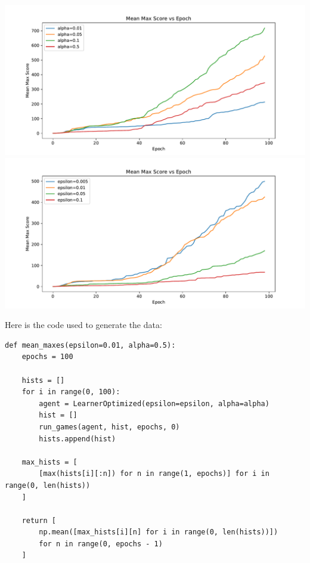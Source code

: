 \documentclass[expanded]{lkx_pset}
\begin{document}
\begin{parts}
	\begin{center}
		\includegraphics[scale=0.5]{figures/alpha_graph.pdf}
		\includegraphics[scale=0.5]{figures/epsilon_graph.pdf}
	\end{center}


	Here is the code used to generate the data:
	\begin{verbatim}
def mean_maxes(epsilon=0.01, alpha=0.5):
    epochs = 100

    hists = []
    for i in range(0, 100):
        agent = LearnerOptimized(epsilon=epsilon, alpha=alpha)
        hist = []
        run_games(agent, hist, epochs, 0)
        hists.append(hist)

    max_hists = [
        [max(hists[i][:n]) for n in range(1, epochs)] for i in range(0, len(hists))
    ]

    return [
        np.mean([max_hists[i][n] for i in range(0, len(hists))])
        for n in range(0, epochs - 1)
    ]
	\end{verbatim}
\end{parts}
\end{document}
